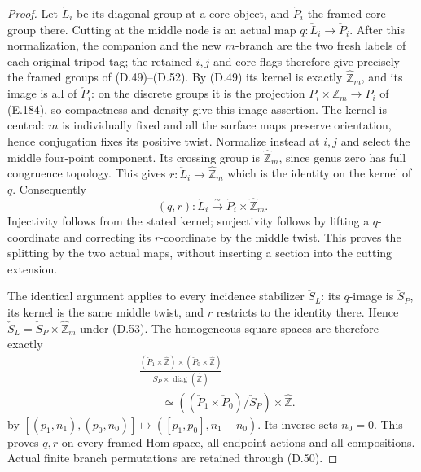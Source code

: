 \begin{proof}
Let $\check L_i$ be its diagonal group at a
core object, and $\check P_i$ the framed core
group there.  Cutting at the middle node is
an actual map $q:\check L_i\to\check P_i$.
After this normalization, the companion and
the new $m$-branch are the two fresh labels
of each original tripod tag; the retained
$i,j$ and core flags therefore give precisely
the framed groups of (D.49)--(D.52).
By (D.49) its kernel is exactly
$\widehat{\mathbb Z}_m$, and its image is all
of $\check P_i$: on the discrete groups it
is the projection $P_i\times\mathbb Z_m\to P_i$
of (E.184), so compactness and density give
this image assertion.  The kernel is central:
$m$ is individually fixed and all the surface
maps preserve orientation, hence conjugation
fixes its positive twist.  Normalize instead at
$i,j$ and select the middle four-point
component.  Its crossing group is
$\widehat{\mathbb Z}_m$, since genus zero
has full congruence topology.  This gives
$r:\check L_i\to\widehat{\mathbb Z}_m$
which is the identity on the kernel of $q$.
Consequently
\[
             (q,r):\check L_i\xrightarrow{\sim}
                    \check P_i\times\widehat{\mathbb Z}_m.
                                                               \tag{D.53}
\]
Injectivity follows from the stated kernel;
surjectivity follows by lifting a $q$-coordinate
and correcting its $r$-coordinate by the
middle twist.  This proves the splitting by
the two actual maps, without inserting a
section into the cutting extension.

The identical argument applies to every
incidence stabilizer $\check S_L$: its
$q$-image is $\check S_P$, its kernel is the
same middle twist, and $r$ restricts to the
identity there.  Hence
$\check S_L=\check S_P\times\widehat{\mathbb Z}_m$
under (D.53).  The homogeneous square spaces
are therefore exactly
\[
 \begin{aligned}
 &\frac{(\check P_1\times\widehat{\mathbb Z})
             \times(\check P_0\times\widehat{\mathbb Z})}
       {\check S_P\times\operatorname{diag}(\widehat{\mathbb Z})}\\
 &\qquad\simeq
       ((\check P_1\times\check P_0)/\check S_P)
                          \times\widehat{\mathbb Z}.
 \end{aligned}                                               \tag{D.54}
\]
by $[(p_1,n_1),(p_0,n_0)]\mapsto([p_1,p_0],n_1-n_0)$.
Its inverse sets $n_0=0$.  This proves $q,r$ on
every framed Hom-space, all endpoint actions
and all compositions.  Actual finite branch
permutations are retained through (D.50).


\end{proof}
